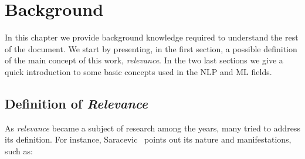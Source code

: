\chapter{Background} %

\label{Background} %

In this chapter we provide background knowledge required to understand the rest of the document. We start by presenting, in the first section, a possible definition of the main concept of this work, \textit{relevance}. In the two last sections we give a quick introduction to some basic concepts used in the NLP and ML fields.

\section{Definition of \textit{Relevance}}

As \textit{relevance} became a subject of research among the years, many tried to address its definition. For instance, Saracevic~\citep{Saracevic1996RelevanceReconsidered,Saracevic2007RelevanceReview} points out its nature and manifestations, such as:

